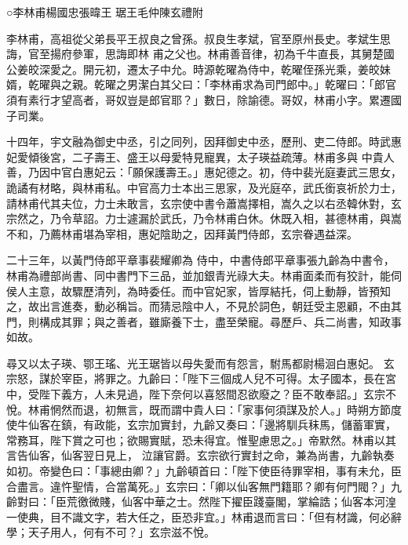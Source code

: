 
\begin{pinyinscope}

 ○李林甫楊國忠張暐王
 琚王毛仲陳玄禮附



 李林甫，高祖從父弟長平王叔良之曾孫。叔良生孝斌，官至原州長史。孝斌生思誨，官至揚府參軍，思誨即林
 甫之父也。林甫善音律，初為千牛直長，其舅楚國公姜皎深愛之。開元初，遷太子中允。時源乾曜為侍中，乾曜侄孫光乘，姜皎妹婿，乾曜與之親。乾曜之男潔白其父曰：「李林甫求為司門郎中。」乾曜曰：「郎官須有素行才望高者，哥奴豈是郎官耶？」數日，除諭德。哥奴，林甫小字。累遷國子司業。



 十四年，宇文融為御史中丞，引之同列，因拜御史中丞，歷刑、吏二侍郎。時武惠妃愛傾後宮，二子壽王、盛王以母愛特見寵異，太子瑛益疏薄。林甫多與
 中貴人善，乃因中官白惠妃云：「願保護壽王。」惠妃德之。初，侍中裴光庭妻武三思女，詭譎有材略，與林甫私。中官高力士本出三思家，及光庭卒，武氏銜哀祈於力士，請林甫代其夫位，力士未敢言，玄宗使中書令蕭嵩擇相，嵩久之以右丞韓休對，玄宗然之，乃令草詔。力士遽漏於武氏，乃令林甫白休。休既入相，甚德林甫，與嵩不和，乃薦林甫堪為宰相，惠妃陰助之，因拜黃門侍郎，玄宗眷遇益深。



 二十三年，以黃門侍郎平章事裴耀卿為
 侍中，中書侍郎平章事張九齡為中書令，林甫為禮部尚書、同中書門下三品，並加銀青光祿大夫。林甫面柔而有狡計，能伺侯人主意，故驟歷清列，為時委任。而中官妃家，皆厚結托，伺上動靜，皆預知之，故出言進奏，動必稱旨。而猜忌陰中人，不見於詞色，朝廷受主恩顧，不由其門，則構成其罪；與之善者，雖廝養下士，盡至榮寵。尋歷戶、兵二尚書，知政事如故。



 尋又以太子瑛、鄂王瑤、光王琚皆以母失愛而有怨言，駙馬都尉楊洄白惠妃。
 玄宗怒，謀於宰臣，將罪之。九齡曰：「陛下三個成人兒不可得。太子國本，長在宮中，受陛下義方，人未見過，陛下奈何以喜怒間忍欲廢之？臣不敢奉詔。」玄宗不悅。林甫惘然而退，初無言，既而謂中貴人曰：「家事何須謀及於人。」時朔方節度使牛仙客在鎮，有政能，玄宗加實封，九齡又奏曰：「邊將馴兵秣馬，儲蓄軍實，常務耳，陛下賞之可也；欲賜實賦，恐未得宜。惟聖慮思之。」帝默然。林甫以其言告仙客，仙客翌日見上，
 泣讓官爵。玄宗欲行實封之命，兼為尚書，九齡執奏如初。帝變色曰：「事總由卿？」九齡頓首曰：「陛下使臣待罪宰相，事有未允，臣合盡言。違忤聖情，合當萬死。」玄宗曰：「卿以仙客無門籍耶？卿有何門閥？」九齡對曰：「臣荒徼微賤，仙客中華之士。然陛下擢臣踐臺閣，掌綸誥；仙客本河湟一使典，目不識文字，若大任之，臣恐非宜。」林甫退而言曰：「但有材識，何必辭學；天子用人，何有不可？」玄宗滋不悅。




\end{pinyinscope}
